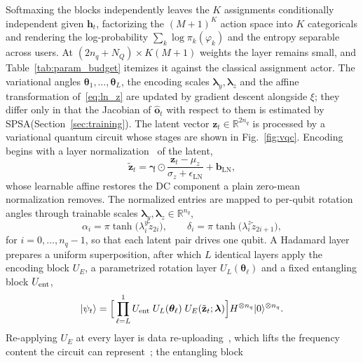 \documentclass[12pt,onecolumn]{IEEEtran}
\begin{document}
Softmaxing the blocks independently leaves the $K$ assignments conditionally independent given $\mathbf{h}_t$, factorizing the $(M{+}1)^K$ action space into $K$ categoricals and rendering the log-probability $\sum_k \log \pi_k(\varphi_k)$ and the entropy separable across users.
At $(2n_q + N_Q)\times K(M{+}1)$ weights the layer remains small, and Table~\ref{tab:param_budget} itemizes it against the classical assignment actor.
The variational angles $\boldsymbol{\theta}_1,\ldots,\boldsymbol{\theta}_L$, the encoding scales $\boldsymbol{\lambda}_y,\boldsymbol{\lambda}_z$ and the affine transformation of~\eqref{eq:ln_z} are updated by gradient descent alongside $\xi$; they differ only in that the Jacobian of $\hat{\mathbf{o}}_t$ with respect to them is estimated by SPSA(Section~\ref{sec:training}).
\else
The latent vector $\mathbf{z}_t\in\mathbb{R}^{2n_q}$ is processed by a variational quantum
circuit whose stages are shown in Fig.~\ref{fig:vqc}. Encoding begins with a layer
normalization~\cite{ba2016layer} of the latent,
\begin{equation}
    \tilde{\mathbf{z}}_t
    =
    \boldsymbol{\gamma}\odot\frac{\mathbf{z}_t - \mu_{z}}{\sigma_{z} + \epsilon_{\mathrm{LN}}}
    + \mathbf{b}_{\mathrm{LN}},
    \label{eq:ln_z}
\end{equation}
whose learnable affine restores the DC component a plain zero-mean normalization removes.
The normalized entries are mapped to per-qubit rotation angles through trainable scales
$\boldsymbol{\lambda}_y,\boldsymbol{\lambda}_z\in\mathbb{R}^{n_q}$,
\begin{equation}
    \alpha_i = \pi \tanh\bigl(\lambda^y_i \tilde{z}_{2i}\bigr),
    \qquad
    \delta_i = \pi \tanh\bigl(\lambda^z_i \tilde{z}_{2i+1}\bigr),
    \label{eq:encoding_angles}
\end{equation}
for $i = 0,\ldots,n_q-1$, so that each latent pair drives one qubit. A Hadamard layer prepares a uniform
superposition, after which $L$ identical layers apply the encoding block $U_E$, a
parametrized rotation layer $U_L(\boldsymbol{\theta}_\ell)$ and a fixed entangling block
$U_{\rm ent}$,
\begin{equation}
    |\psi_t\rangle
    =
    \Bigl[\,\prod_{\ell=L}^{1} U_{\rm ent}\;U_L(\boldsymbol{\theta}_\ell)\;U_E(\tilde{\mathbf{z}}_t;\boldsymbol{\lambda})\Bigr]
    H^{\otimes n_q}|0\rangle^{\otimes n_q}.
    \label{eq:vqc_state}
\end{equation}
Re-applying $U_E$ at every layer is data re-uploading~\cite{perez2020data}, which lifts the
frequency content the circuit can represent~\cite{schuld2021effect}; the entangling block
\end{document}
